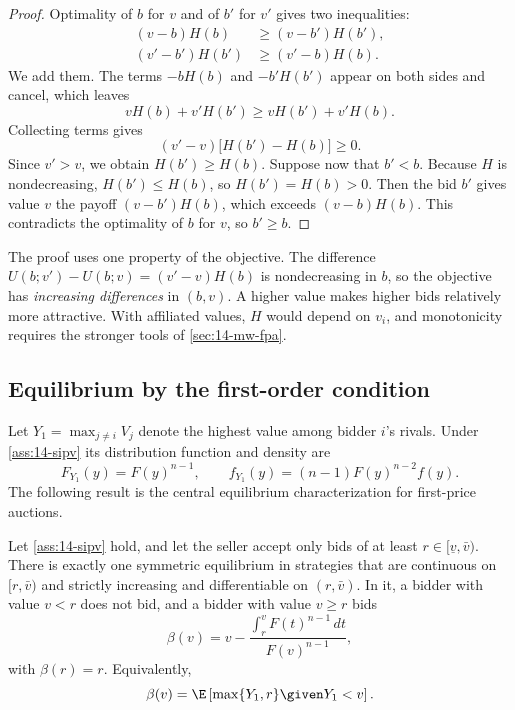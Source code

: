 \begin{proof}
Optimality of $b$ for $v$ and of $b'$ for $v'$ gives two inequalities:
\begin{align*}
(v-b)H(b)&\ge(v-b')H(b'),\\
(v'-b')H(b')&\ge(v'-b)H(b).
\end{align*}
We add them. The terms $-bH(b)$ and $-b'H(b')$ appear on both sides and cancel, which leaves
\[
vH(b)+v'H(b')\ge vH(b')+v'H(b).
\]
Collecting terms gives
\[
(v'-v)\big[H(b')-H(b)\big]\ge 0.
\]
Since $v'>v$, we obtain $H(b')\ge H(b)$. Suppose now that $b'<b$. Because $H$ is nondecreasing, $H(b')\le H(b)$, so $H(b')=H(b)>0$. Then the bid $b'$ gives value $v$ the payoff $(v-b')H(b)$, which exceeds $(v-b)H(b)$. This contradicts the optimality of $b$ for $v$, so $b'\ge b$.
\end{proof}

The proof uses one property of the objective. The difference $U(b;v')-U(b;v)=(v'-v)H(b)$ is nondecreasing in $b$, so the objective has \emph{increasing differences} in $(b,v)$. A higher value makes higher bids relatively more attractive. With affiliated values, $H$ would depend on $v_i$, and monotonicity requires the stronger tools of \cref{sec:14-mw-fpa}.

\subsection{Equilibrium by the first-order condition}\label{sec:14-fpa-foc}

Let $Y_1=\max_{j\neq i}V_j$ denote the highest value among bidder $i$'s rivals. Under \cref{ass:14-sipv} its distribution function and density are
\[
F_{Y_1}(y)=F(y)^{n-1},\qquad f_{Y_1}(y)=(n-1)F(y)^{n-2}f(y).
\]
The following result is the central equilibrium characterization for first-price auctions.

\begin{proposition}\label{prop:14-rs}
Let \cref{ass:14-sipv} hold, and let the seller accept only bids of at least $r\in[\underline v,\bar v)$. There is exactly one symmetric equilibrium in strategies that are continuous on $[r,\bar v)$ and strictly increasing and differentiable on $(r,\bar v)$. In it, a bidder with value $v<r$ does not bid, and a bidder with value $v\ge r$ bids
\begin{equation}\label{eq:14-rs-bid}
\beta(v)=v-\frac{\int_r^v F(t)^{n-1}\,dt}{F(v)^{n-1}},
\end{equation}
with $\beta(r)=r$. Equivalently,
\begin{equation}\label{eq:14-rs-condexp}
\beta(v)=\E\left[\max\{Y_1,r\}\given Y_1<v\right].
\end{equation}
\end{proposition}

